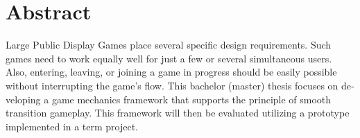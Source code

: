 \chapter{Abstract}

\begin{english}
Large Public Display Games place several specific design requirements. Such
games need to work equally well for just a few or several simultaneous users.
Also, entering, leaving, or joining a game in progress should be easily possible
without interrupting the game's flow. This bachelor (master) thesis focuses on
developing a game mechanics framework that supports the principle of smooth
transition gameplay. This framework will then be evaluated utilizing a prototype
implemented in a term project.
\end{english}
